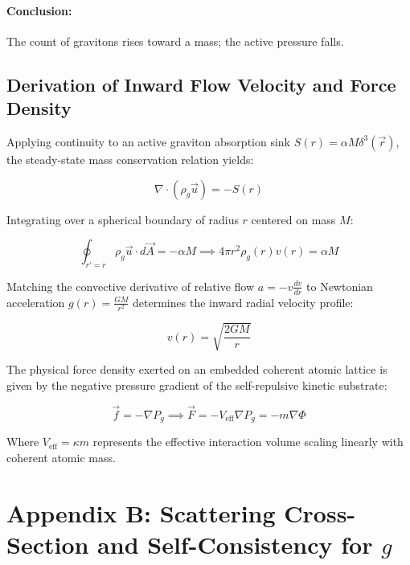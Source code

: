 \documentclass[12pt, a4paper]{article}
\begin{document}
\paragraph{Conclusion:}
The count of gravitons rises toward a mass; the active pressure falls. 
\subsection*{Derivation of Inward Flow Velocity and Force Density}

Applying continuity to an active graviton absorption sink $S(r) = \alpha M \delta^3(\vec{r})$, the steady-state mass conservation relation yields:

\begin{equation}
\nabla \cdot (\rho_g \vec{u}) = -S(r)
\end{equation}

Integrating over a spherical boundary of radius $r$ centered on mass $M$:

\begin{equation}
\oint_{r'=r} \rho_g \vec{u} \cdot d\vec{A} = -\alpha M \implies 4\pi r^2 \rho_g(r) v(r) = \alpha M
\end{equation}

Matching the convective derivative of relative flow $a = -v \frac{dv}{dr}$ to Newtonian acceleration $g(r) = \frac{GM}{r^2}$ determines the inward radial velocity profile:

\begin{equation}
v(r) = \sqrt{\frac{2GM}{r}}
\end{equation}

The physical force density exerted on an embedded coherent atomic lattice is given by the negative pressure gradient of the self-repulsive kinetic substrate:

\begin{equation}
\vec{f} = -\nabla P_g \implies \vec{F} = -V_{\text{eff}} \nabla P_g = -m \nabla \Phi
\end{equation}

Where $V_{\text{eff}} = \kappa m$ represents the effective interaction volume scaling linearly with coherent atomic mass.

\section{Appendix B: Scattering Cross-Section and Self-Consistency for \( g \)}
\label{app:B}
\end{document}
